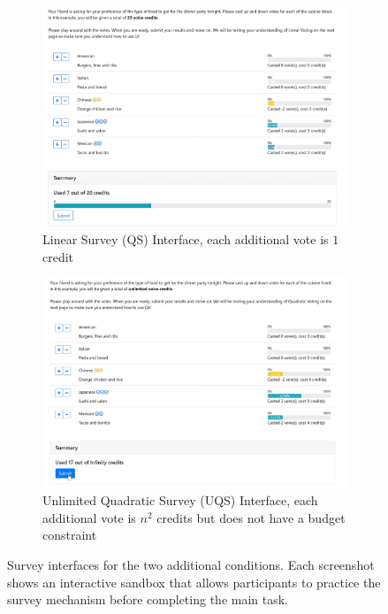 \begin{figure}
    \centering
    \begin{subfigure}{0.75\textwidth}
        \centering
        \includegraphics[width=\textwidth]{content/image/linear.png}
        \caption{Linear Survey (QS) Interface, each additional vote is $1$ credit}
        \label{fig:qs_interface}
    \end{subfigure}
    
    \vspace*{1cm}

    \begin{subfigure}{0.75\textwidth}
        \centering
        \includegraphics[width=\textwidth]{content/image/uqs.png}
        \caption{Unlimited Quadratic Survey (UQS) Interface, each additional vote is $n^2$ credits but does not have a budget constraint}
        \label{fig:css_interface}
    \end{subfigure}
    
    \caption{Survey interfaces for the two additional conditions. Each screenshot shows an interactive sandbox that allows  participants to practice the survey mechanism before completing the main task.}
    \label{fig:extended_interface}
\end{figure}



